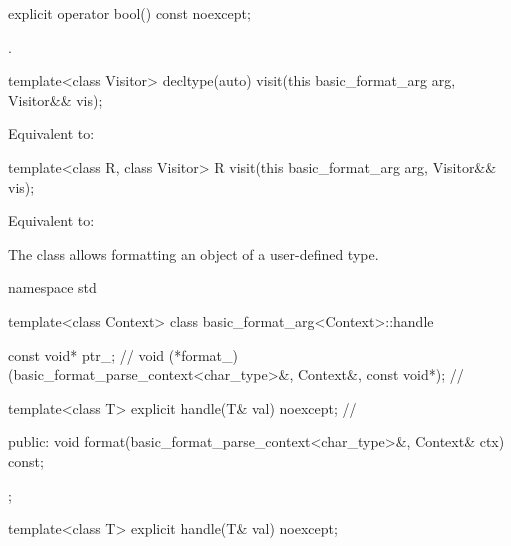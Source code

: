 %

%
\begin{itemdecl}
explicit operator bool() const noexcept;
\end{itemdecl}

\begin{itemdescr}
\pnum
\returns
{}.
\end{itemdescr}

%
\begin{itemdecl}
template<class Visitor>
  decltype(auto) visit(this basic_format_arg arg, Visitor&& vis);
\end{itemdecl}

\begin{itemdescr}
\pnum
\effects
Equivalent to: 
\end{itemdescr}

%
\begin{itemdecl}
template<class R, class Visitor>
  R visit(this basic_format_arg arg, Visitor&& vis);
\end{itemdecl}

\begin{itemdescr}
\pnum
\effects
Equivalent to: 
\end{itemdescr}

\pnum
The class  allows formatting an object of a user-defined type.

%
%
\begin{codeblock}
namespace std {
  template<class Context>
  class basic_format_arg<Context>::handle {
    const void* ptr_;                                           // \expos
    void (*format_)(basic_format_parse_context<char_type>&,
                    Context&, const void*);                     // \expos

    template<class T> explicit handle(T& val) noexcept;         // \expos

  public:
    void format(basic_format_parse_context<char_type>&, Context& ctx) const;
  };
}
\end{codeblock}

%
\begin{itemdecl}
template<class T> explicit handle(T& val) noexcept;
\end{itemdecl}

